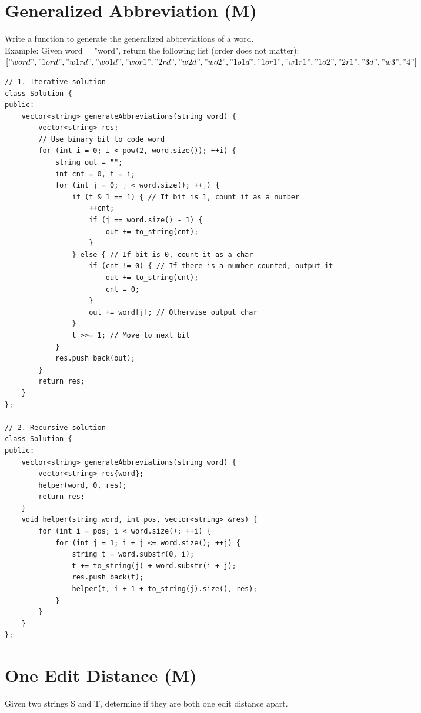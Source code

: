 \section{Generalized Abbreviation (M)}
Write a function to generate the generalized abbreviations of a word.\\

Example: Given word = "word", return the following list (order does not matter):\\
$["word", "1ord", "w1rd", "wo1d", "wor1", "2rd", "w2d", "wo2", "1o1d", "1or1", "w1r1", \\
"1o2", "2r1", "3d", "w3", "4"]$ \\

\begin{lstlisting}
// 1. Iterative solution
class Solution {
public:
    vector<string> generateAbbreviations(string word) {
        vector<string> res;
        // Use binary bit to code word
        for (int i = 0; i < pow(2, word.size()); ++i) {
            string out = "";
            int cnt = 0, t = i;
            for (int j = 0; j < word.size(); ++j) {
                if (t & 1 == 1) { // If bit is 1, count it as a number
                    ++cnt;
                    if (j == word.size() - 1) {
                        out += to_string(cnt);
                    }
                } else { // If bit is 0, count it as a char
                    if (cnt != 0) { // If there is a number counted, output it
                        out += to_string(cnt);
                        cnt = 0;
                    }
                    out += word[j]; // Otherwise output char
                }
                t >>= 1; // Move to next bit
            }
            res.push_back(out);
        }
        return res;
    }
};

// 2. Recursive solution
class Solution {
public:
    vector<string> generateAbbreviations(string word) {
        vector<string> res{word};
        helper(word, 0, res);
        return res;
    }
    void helper(string word, int pos, vector<string> &res) {
        for (int i = pos; i < word.size(); ++i) {
            for (int j = 1; i + j <= word.size(); ++j) {
                string t = word.substr(0, i);
                t += to_string(j) + word.substr(i + j);
                res.push_back(t);
                helper(t, i + 1 + to_string(j).size(), res);
            }
        }
    }
};
\end{lstlisting}


\section{One Edit Distance (M)}
Given two strings S and T, determine if they are both one edit distance apart.\\

